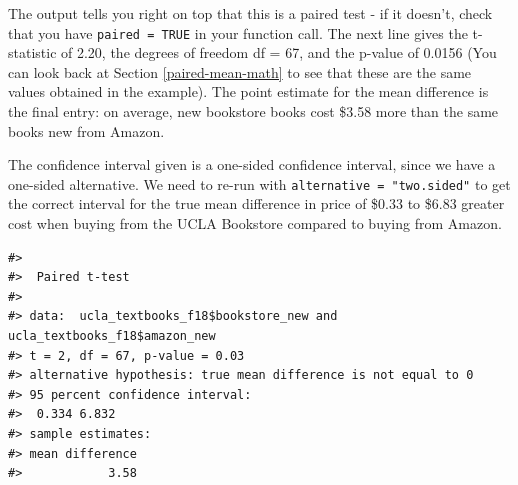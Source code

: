 \documentclass[
  10pt,
  openany]{book}
\newenvironment{Shaded}{\begin{snugshade}}{\end{snugshade}}
\newcommand{\AttributeTok}[1]{\textcolor[rgb]{0.13,0.29,0.53}{#1}}
\newcommand{\CommentTok}[1]{\textcolor[rgb]{0.56,0.35,0.01}{\textit{#1}}}
\newcommand{\ConstantTok}[1]{\textcolor[rgb]{0.56,0.35,0.01}{#1}}
\newcommand{\FloatTok}[1]{\textcolor[rgb]{0.00,0.00,0.81}{#1}}
\newcommand{\FunctionTok}[1]{\textcolor[rgb]{0.13,0.29,0.53}{\textbf{#1}}}
\newcommand{\NormalTok}[1]{#1}
\newcommand{\SpecialCharTok}[1]{\textcolor[rgb]{0.81,0.36,0.00}{\textbf{#1}}}
\newcommand{\StringTok}[1]{\textcolor[rgb]{0.31,0.60,0.02}{#1}}
\theoremstyle{definition}
\theoremstyle{definition}
\theoremstyle{definition}
\theoremstyle{definition}
\theoremstyle{remark}
\begin{document}
\begin{Shaded}
\end{Shaded}

The output tells you right on top that this is a paired test - if it doesn't, check that you have \texttt{paired\ =\ TRUE} in your function call. The next line gives the t-statistic of 2.20, the degrees of freedom df = 67, and the p-value of 0.0156 (You can look back at Section \ref{paired-mean-math} to see that these are the same values obtained in the example). The point estimate for the mean difference is the final entry: on average, new bookstore books cost \$3.58 more than the same books new from Amazon.

The confidence interval given is a one-sided confidence interval, since we have a one-sided alternative. We need to re-run with \texttt{alternative\ =\ "two.sided"} to get the correct interval for the true mean difference in price of \$0.33 to \$6.83 greater cost when buying from the UCLA Bookstore compared to buying from Amazon.

\begin{verbatim}
#> 
#>  Paired t-test
#> 
#> data:  ucla_textbooks_f18$bookstore_new and ucla_textbooks_f18$amazon_new
#> t = 2, df = 67, p-value = 0.03
#> alternative hypothesis: true mean difference is not equal to 0
#> 95 percent confidence interval:
#>  0.334 6.832
#> sample estimates:
#> mean difference 
#>            3.58
\end{verbatim}
\end{document}

